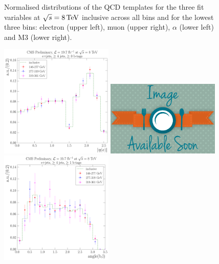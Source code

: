 \begin{figure}[hbtp]
	 \caption{Normalised distributions of the QCD templates for the three fit variables at $\sqrt{s}=8\,\text{Te\hspace{-.08em}V}$
	 inclusive across all \HT bins and for the lowest three \met bins: electron \abseta (upper
	 left), muon \abseta (upper right), $\alpha$ (lower left) and M3 (lower right).}
     \label{fig:HT_fit_variable_qcd_comparisons_8TeV}
\end{figure}

\begin{figure}[hbtp]
    \centering
     \includegraphics[width=0.48\textwidth]{Chapters/04_Analysis/04b_XSections/images/8TeV/fit_variables/ST/electron_absolute_eta/qcd/ST_electron_absolute_eta_0orMoreBtag_QCD_template_comparison.pdf}\hfill
     \includegraphics[width=0.48\textwidth]{Chapters/04_Analysis/04b_XSections/images/placeholder.png}\hfill
     \includegraphics[width=0.48\textwidth]{Chapters/04_Analysis/04b_XSections/images/8TeV/fit_variables/ST/angle_bl/qcd/ST_angle_bl_1orMoreBtag_QCD_template_comparison.pdf}\hfill

\end{figure}
